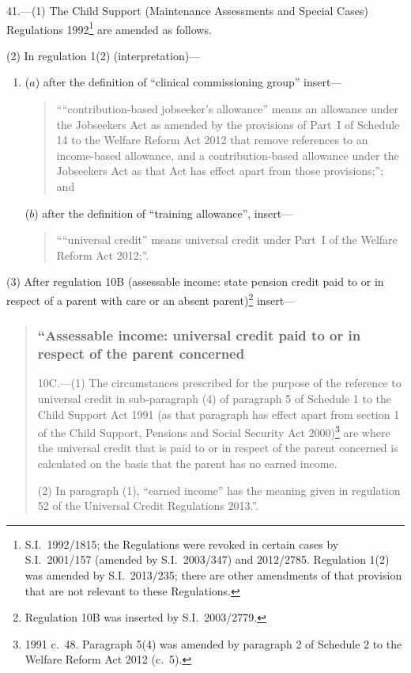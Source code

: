 \documentclass[12pt,a4paper]{article}
\begin{document}
41.—(1) The Child Support (Maintenance Assessments and Special Cases) Regulations 1992\footnote{S.I.~1992/1815; the Regulations were revoked in certain cases by S.I.~2001/157 (amended by S.I.~2003/347) and 2012/2785. Regulation 1(2) was amended by S.I.~2013/235; there are other amendments of that provision that are not relevant to these Regulations.} are amended as follows.

(2) In regulation 1(2) (interpretation)—
\begin{enumerate}\item[]
($a$) after the definition of “clinical commissioning group” insert—
\begin{quotation}
““contribution-based jobseeker’s allowance” means an allowance under the Jobseekers Act as amended by the provisions of Part~I of Schedule 14 to the Welfare Reform Act 2012 that remove references to an income-based allowance, and a contribution-based allowance under the Jobseekers Act as that Act has effect apart from those provisions;”; and
\end{quotation}

($b$) after the definition of “training allowance”, insert—
\begin{quotation}
““universal credit” means universal credit under Part~I of the Welfare Reform Act 2012;”.
\end{quotation}
\end{enumerate}

(3) After regulation 10B (assessable income: state pension credit paid to or in respect of a parent with care or an absent parent)\footnote{Regulation 10B was inserted by S.I.~2003/2779.} insert—
\begin{quotation}
\subsubsection*{“Assessable income: universal credit paid to or in respect of the parent concerned}

10C.—(1) The circumstances prescribed for the purpose of the reference to universal credit in sub-paragraph (4) of paragraph 5 of Schedule 1 to the Child Support Act 1991 (as that paragraph has effect apart from section 1 of the Child Support, Pensions and Social Security Act 2000)\footnote{1991 c.~48. Paragraph 5(4) was amended by paragraph 2 of Schedule 2 to the Welfare Reform Act 2012 (c.~5).} are where the universal credit that is paid to or in respect of the parent concerned is calculated on the basis that the parent has no earned income.

(2) In paragraph (1), “earned income” has the meaning given in regulation 52 of the Universal Credit Regulations 2013.”.
\end{quotation}
\end{document}
